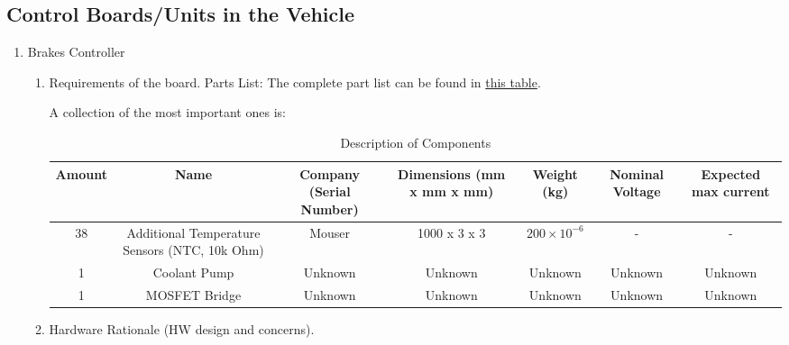 \subsection{Control Boards/Units in the Vehicle}

\begin{enumerate}
    \item Brakes Controller
    \begin{enumerate}
        \item Requirements of the board.
        Parts List:
The complete part list can be found in \href{https://docs.google.com/spreadsheets/d/1GvvRlhKn8gMCE3rAxvrYHUjA288l9iqX/edit#gid=378650025}{this table}. 

A collection of the most important ones is:
            \begin{table}[h]
                \centering
                \begin{adjustbox}{width=\textwidth,center}
                    \begin{tabular}{|c|c|c|c|c|c|c|}
                    \hline
                    \textbf{Amount} & \textbf{Name} & \textbf{Company (Serial Number)} & \textbf{Dimensions (mm x mm x mm)} & \textbf{Weight (kg)} & \textbf{Nominal Voltage} & \textbf{Expected max current} \\
                    \hline
                    38 & Additional Temperature Sensors (NTC, 10k Ohm) & Mouser & 1000 x 3 x 3 & $200 \times 10^{-6}$ & - & - \\
                    \hline
                    1 & Coolant Pump & Unknown & Unknown & Unknown & Unknown & Unknown \\
                    \hline
                    1 & MOSFET Bridge & Unknown & Unknown & Unknown & Unknown & Unknown \\
                    \hline
                    \end{tabular}
                \end{adjustbox}
                \caption{Description of Components}
                \label{tab:components}
            \end{table}
        \item Hardware Rationale (HW design and concerns). \\

\end{enumerate}
\end{enumerate}
